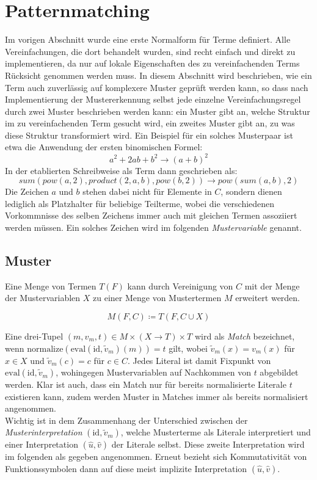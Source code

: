 \documentclass{article}
\begin{document}
\section{Patternmatching}
Im vorigen Abschnitt wurde eine erste Normalform für Terme definiert. Alle Vereinfachungen, die dort behandelt wurden, sind recht einfach und direkt zu implementieren, da nur auf lokale Eigenschaften des zu vereinfachenden Terms Rücksicht genommen werden muss. In diesem Abschnitt wird beschrieben, wie ein Term auch zuverlässig auf komplexere Muster geprüft werden kann, so dass nach Implementierung der Mustererkennung selbst jede einzelne Vereinfachungsregel durch zwei Muster beschrieben werden kann: ein Muster gibt an, welche Struktur im zu vereinfachenden Term gesucht wird, ein zweites Muster gibt an, zu was diese Struktur transformiert wird. Ein Beispiel für ein solches Musterpaar ist etwa die Anwendung der ersten binomischen Formel:
$$a^2 + 2 a b + b^2 \rightarrow (a + b)^2$$
In der etablierten Schreibweise als Term dann geschrieben als:
$$sum(pow(a, 2), product(2, a, b), pow(b, 2)) \rightarrow pow(sum(a, b), 2)$$
Die Zeichen $a$ und $b$ stehen dabei nicht für Elemente in $C$, sondern dienen lediglich als Platzhalter für beliebige Teilterme, wobei die verschiedenen Vorkommnisse des selben Zeichens immer auch mit gleichen Termen assoziiert werden müssen. Ein solches Zeichen wird im folgenden \emph{Mustervariable} genannt.

\subsection{Muster}
Eine Menge von Termen $T(F)$ kann durch Vereinigung von $C$ mit der Menge der Mustervariablen $X$ zu einer Menge von Mustertermen $M$ erweitert werden. 

$$M(F, C) \coloneqq T(F, C \cup X)$$

Eine drei-Tupel $(m, v_m, t) \in M \times (X \rightarrow T) \times T$ wird als \emph{Match} bezeichnet, wenn $\mathrm{normalize}(\mathrm{eval}(\mathrm{id}, \tilde v_m)(m))= t$ gilt, wobei $\tilde v_m(x) = v_m(x)$ für $x \in X$ und $\tilde v_m(c) = c$ für $c \in C$. Jedes Literal ist damit Fixpunkt von $\mathrm{eval}(\mathrm{id}, \tilde v_m)$, wohingegen Mustervariablen auf Nachkommen von $t$ abgebildet werden. 
Klar ist auch, dass ein Match nur für bereits normalisierte Literale $t$ existieren kann, zudem werden Muster in Matches immer als bereits normalisiert angenommen.\\
Wichtig ist in dem Zusammenhang der Unterschied zwischen der \emph{Musterinterpretation} $(\mathrm{id}, \tilde v_m)$, welche Musterterme als Literale interpretiert und einer Interpretation $(\hat{u}, \hat{v})$ der Literale selbst. Diese zweite Interpretation wird im folgenden als gegeben angenommen. Erneut bezieht sich Kommutativität von Funktionssymbolen dann auf diese meist implizite Interpretation $(\hat u, \hat v)$.\\
\end{document}
